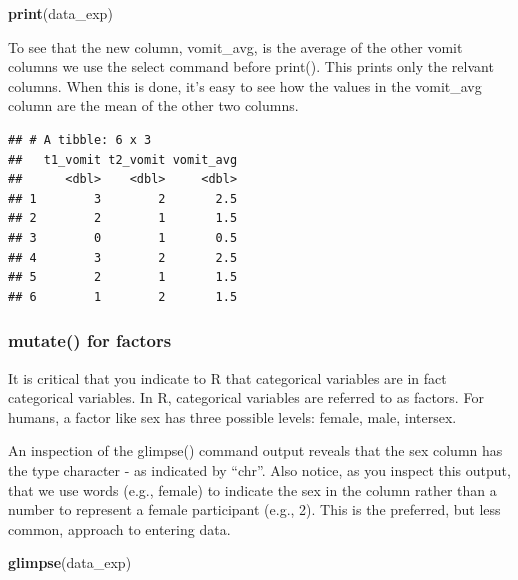 \documentclass[
]{krantz}
\makeatletter
\newenvironment{Shaded}{\begin{snugshade}}{\end{snugshade}}
\newcommand{\KeywordTok}[1]{\textcolor[rgb]{0.27,0.27,0.27}{\textbf{#1}}}
\newcommand{\NormalTok}[1]{#1}
\newcommand{\OperatorTok}[1]{\textcolor[rgb]{0.43,0.43,0.43}{\textbf{#1}}}
\newcommand{\StringTok}[1]{\textcolor[rgb]{0.5,0.5,0.5}{#1}}
\newenvironment{kframe}{%
\medskip{}
\setlength{\fboxsep}{.8em}
 \def\at@end@of@kframe{}%
 \ifinner\ifhmode%
  \def\at@end@of@kframe{\end{minipage}}%
  \begin{minipage}{\columnwidth}%
 \fi\fi%
 \def\FrameCommand##1{\hskip\@totalleftmargin \hskip-\fboxsep
 \colorbox{shadecolor}{##1}\hskip-\fboxsep
     \hskip-\linewidth \hskip-\@totalleftmargin \hskip\columnwidth}%
 \MakeFramed {\advance\hsize-\width
   \@totalleftmargin\z@ \linewidth\hsize
   \@setminipage}}%
 {\par\unskip\endMakeFramed%
 \at@end@of@kframe}
\renewenvironment{Shaded}{\begin{kframe}}{\end{kframe}}
\makeatother
\begin{document}
\begin{Shaded}
\begin{Highlighting}[]
\KeywordTok{print}\NormalTok{(data_exp)}
\end{Highlighting}
\end{Shaded}

To see that the new column, vomit\_avg, is the average of the other vomit columns we use the select command before print(). This prints only the relvant columns. When this is done, it's easy to see how the values in the vomit\_avg column are the mean of the other two columns.

\begin{Shaded}
\end{Shaded}

\begin{verbatim}
## # A tibble: 6 x 3
##   t1_vomit t2_vomit vomit_avg
##      <dbl>    <dbl>     <dbl>
## 1        3        2       2.5
## 2        2        1       1.5
## 3        0        1       0.5
## 4        3        2       2.5
## 5        2        1       1.5
## 6        1        2       1.5
\end{verbatim}

\hypertarget{mutate-for-factors}{%
\subsubsection{mutate() for factors}\label{mutate-for-factors}}

It is critical that you indicate to R that categorical variables are in fact categorical variables. In R, categorical variables are referred to as factors. For humans, a factor like sex has three possible levels: female, male, intersex.

An inspection of the glimpse() command output reveals that the sex column has the type character - as indicated by ``chr''. Also notice, as you inspect this output, that we use words (e.g., female) to indicate the sex in the column rather than a number to represent a female participant (e.g., 2). This is the preferred, but less common, approach to entering data.

\begin{Shaded}
\begin{Highlighting}[]
\KeywordTok{glimpse}\NormalTok{(data_exp)}
\end{Highlighting}
\end{Shaded}
\end{document}
